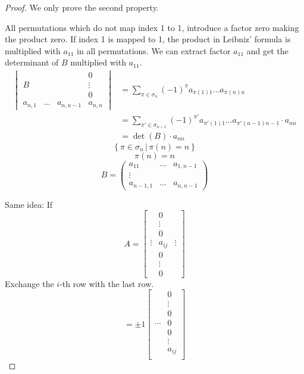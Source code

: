 \documentclass[a4paper]{article}
\numberwithin{lecref}{section}
\newcommand{\setdef}[2]{\left\{\left.#1\,\right|\,#2\right\}}
\begin{document}
\begin{proof}
  We only prove the second property.

  All permutations which do not map index 1 to 1, introduce a factor zero making the product zero.
  If index 1 is mapped to 1, the product in Leibniz' formula is multiplied with $a_{11}$ in all permutations.
  We can extract factor $a_{11}$ and get the determinant of $B$ multiplied with $a_{11}$.
  \begin{align*}
    \begin{vmatrix}
             &         &           & 0  \\
      B      &         &           & \vdots \\
             &         &           & 0  \\
      a_{n,1} & \ldots & a_{n,n-1} & a_{n,n}
    \end{vmatrix}
    &= \sum_{\pi \in \sigma_n} (-1)^{\pi} a_{\pi(1) 1} \dots a_{\pi(n) n} \\
    &= \sum_{\pi' \in \sigma_{n-1}} (-1)^{\pi'} a_{\pi'(1) 1} \dots a_{\pi'(n-1) n-1} \cdot a_{nn} \\
    &= \det(B) \cdot a_{nn}
  \end{align*}
  \[ \setdef{\pi \in \sigma_n}{\pi(n) = n} \]
  \[ \pi(n) = n \]
  \[
    B = \begin{pmatrix}
      a_{11} & \ldots & a_{1,n-1} \\
      \vdots &        & \\
      a_{n-1,1} & \ldots & a_{n,n-1}
    \end{pmatrix}
  \]

  Same idea: If
  \[
    A = \begin{bmatrix}
      & 0 & \\
      & \vdots & \\
      & 0 & \\
      \vdots & a_{ij} & \vdots \\
      & 0 & \\
      & \vdots & \\
      & 0 &
    \end{bmatrix}
  \]
  Exchange the $i$-th row with the last row.
  \[
    = \pm 1 \begin{bmatrix}
      & 0 \\
      & \vdots \\
      & 0 \\
      \cdots & 0 \\
      & 0 \\
      & \vdots \\
      & a_{ij} \\
    \end{bmatrix}
  \]
\end{proof}
\end{document}
